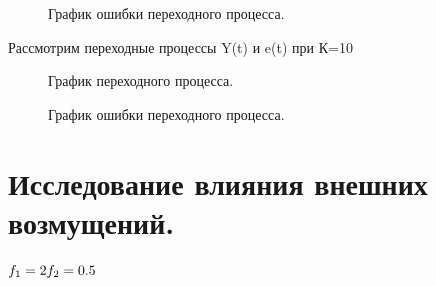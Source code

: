 \documentclass[a4paper, 11pt]{article}
\begin{document}
\begin{figure}[h]
    \caption{График ошибки переходного процесса.}
    \label{tree}
\end{figure}

\newpage

\normalsize{Рассмотрим переходные процессы Y(t) и e(t) при К=10}

\begin{figure}[h]
    \caption{График переходного процесса.}
    \label{two}
\end{figure}

\begin{figure}[h]
    \caption{График ошибки переходного процесса.}
    \label{tree}
\end{figure}

\newpage
\normalsize\section{{Исследование влияния внешних возмущений.}}
\normalsize{
$f_1=2 \\ f_2=0.5$}
\end{document}
